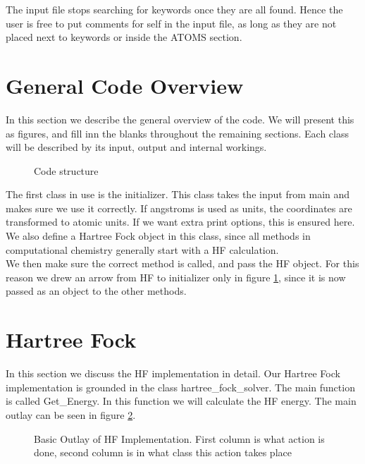 The input file stops searching for keywords once they are all found. Hence the user is free to put comments for self in the input file, as long as they are not placed next to keywords or inside the ATOMS section.

\section{General Code Overview}
In this section we describe the general overview of the code. We will present this as figures, and fill inn the blanks throughout the remaining sections. Each class will be described by its input, output and internal workings. \\

\begin{figure}[h!]
\begin{center}
\caption{Code structure}
\label{fig:structure}
\end{center}
\end{figure}

The first class in use is the initializer. This class takes the input from main and makes sure we use it correctly. If angstroms is used as units, the coordinates are transformed to atomic units. If we want extra print options, this is ensured here. We also define a Hartree Fock object in this class, since all methods in computational chemistry generally start with a HF calculation. \\

We then make sure the correct method is called, and pass the HF object. For this reason we drew an arrow from HF to initializer only in figure \ref{fig:structure}, since it is now passed as an object to the other methods. 


\section{Hartree Fock}
In this section we discuss the HF implementation in detail. Our Hartree Fock implementation is grounded in the class hartree\_fock\_solver. The main function is called Get\_Energy. In this function we will calculate the HF energy. The main outlay can be seen in figure \ref{fig:hfimp}. \\

\newpage

\begin{figure}[h!]
\begin{center}
\caption{Basic Outlay of HF Implementation. First column is what action is done, second column is in what class this action takes place}
\label{fig:hfimp}
\end{center}
\end{figure}

